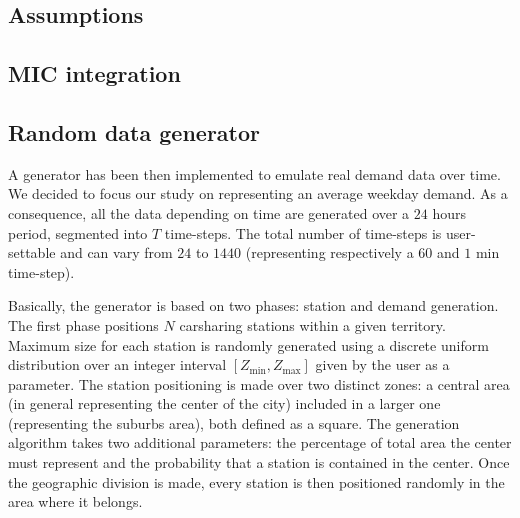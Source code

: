 \begin{bibunit}[ieeetr]
\subsection{Assumptions}
\subsection{MIC integration}
\subsection{Random data generator}
A generator has been then implemented to emulate real demand data over time. We decided to focus our study on representing an average weekday demand. As a consequence, all the data depending on time are generated over a $24$ hours period, segmented into $T$ time-steps. The total number of time-steps is user-settable and can vary from $24$ to $1440$ (representing respectively a $60$ and $1$ min time-step).

Basically, the generator is based on two phases: station and demand generation. The first phase positions $N$ carsharing stations within a given territory. Maximum size for each station is randomly generated using a discrete uniform distribution over an integer interval $[Z_{\min}, Z_{\max}]$ given by the user as a parameter.
The station positioning is made over two distinct zones: a central area (in general representing the center of the city) included in a larger one (representing the suburbs area), both defined as a square. The generation algorithm takes two additional parameters: the percentage of total area the center must represent and the probability that a station is contained in the center. Once the geographic division is made, every station is then positioned randomly in the area where it belongs. 



\end{bibunit}
